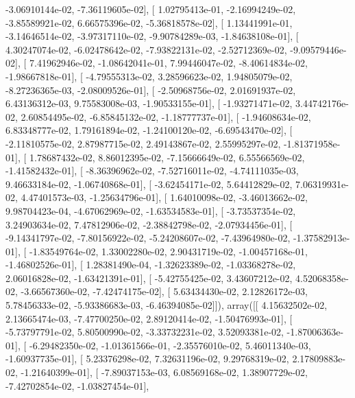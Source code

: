 \documentclass{article}
\begin{document}
         -3.06910144e-02,  -7.36119605e-02],
       [  1.02795413e-01,  -2.16994249e-02,  -3.85589921e-02,
          6.66575396e-02,  -5.36818578e-02],
       [  1.13441991e-01,  -3.14646514e-02,  -3.97317110e-02,
         -9.90784289e-03,  -1.84638108e-01],
       [  4.30247074e-02,  -6.02478642e-02,  -7.93822131e-02,
         -2.52712369e-02,  -9.09579446e-02],
       [  7.41962946e-02,  -1.08642041e-01,   7.99446047e-02,
         -8.40614834e-02,  -1.98667818e-01],
       [ -4.79555313e-02,   3.28596623e-02,   1.94805079e-02,
         -8.27236365e-03,  -2.08009526e-01],
       [ -2.50968756e-02,   2.01691937e-02,   6.43136312e-03,
          9.75583008e-03,  -1.90533155e-01],
       [ -1.93271471e-02,   3.44742176e-02,   2.60854495e-02,
         -6.85845132e-02,  -1.18777737e-01],
       [ -1.94608634e-02,   6.83348777e-02,   1.79161894e-02,
         -1.24100120e-02,  -6.69543470e-02],
       [ -2.11810575e-02,   2.87987715e-02,   2.49143867e-02,
          2.55995297e-02,  -1.81371958e-01],
       [  1.78687432e-02,   8.86012395e-02,  -7.15666649e-02,
          6.55566569e-02,  -1.41582432e-01],
       [ -8.36396962e-02,  -7.52716011e-02,  -4.74111035e-03,
          9.46633184e-02,  -1.06740868e-01],
       [ -3.62454171e-02,   5.64412829e-02,   7.06319931e-02,
          4.47401573e-03,  -1.25634796e-01],
       [  1.64010098e-02,  -3.46013662e-02,   9.98704423e-04,
         -4.67062969e-02,  -1.63534583e-01],
       [ -3.73537354e-02,   3.24903634e-02,   7.47812906e-02,
         -2.38842798e-02,  -2.07934456e-01],
       [ -9.14341797e-02,  -7.80156922e-02,  -5.24208607e-02,
         -7.43964980e-02,  -1.37582913e-01],
       [ -1.83549764e-02,   1.33002280e-02,   2.90431719e-02,
         -1.00457168e-01,  -1.46802526e-01],
       [  1.28381490e-04,  -1.32623389e-02,  -1.03368278e-02,
          2.06016828e-02,  -1.63421391e-01],
       [ -5.42755425e-02,   3.43607212e-02,   4.52068358e-02,
         -3.66567360e-02,  -7.42474175e-02],
       [  5.63434430e-02,   2.12826172e-03,   5.78456333e-02,
         -5.93386683e-03,  -6.46394085e-02]]), array([[  4.15632502e-02,   2.13665474e-03,  -7.47700250e-02,
          2.89120414e-02,  -1.50476993e-01],
       [ -5.73797791e-02,   5.80500990e-02,  -3.33732231e-02,
          3.52093381e-02,  -1.87006363e-01],
       [ -6.29482350e-02,  -1.01361566e-01,  -2.35576010e-02,
          5.46011340e-03,  -1.60937735e-01],
       [  5.23376298e-02,   7.32631196e-02,   9.29768319e-02,
          2.17809883e-02,  -1.21640399e-01],
       [ -7.89037153e-03,   6.08569168e-02,   1.38907729e-02,
         -7.42702854e-02,  -1.03827454e-01],
\end{document}
